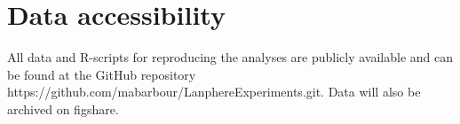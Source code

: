 \documentclass[11pt]{article}
\begin{document}
\section*{Data accessibility}
All data and R-scripts for reproducing the analyses are publicly available and can be found at the GitHub repository https://github.com/mabarbour/Lanphere\textunderscore Experiments.git. Data will also be archived on figshare.

\newpage{}










\end{document}
